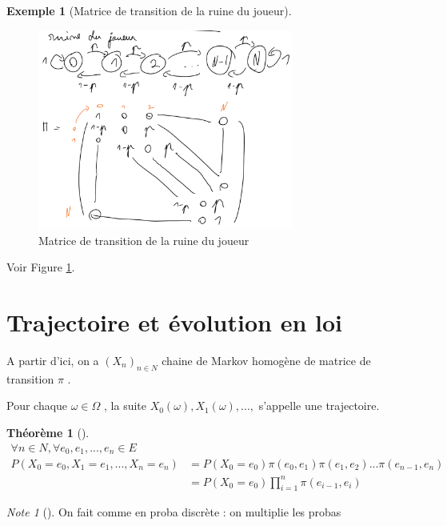 \documentclass{article}
\theoremstyle{plain}%
\newtheorem{thm}{Théorème}[section]
\theoremstyle{definition}
\newtheorem{exmp}{Exemple}[section]
\theoremstyle{remark}
\newtheorem*{note}{Note}
\begin{document}
	\begin{exmp}[Matrice de transition de la ruine du joueur]
		\begin{figure}[!htbp]
			\centering
			\includegraphics[width=0.75\textwidth]{./figures_chap1/figure4.png}
			\caption{Matrice de transition de la ruine du joueur}
			\label{graph2}
		\end{figure}
		Voir Figure \ref{graph2}.
	\end{exmp}
	
	\section{Trajectoire et évolution en loi}
	A partir d'ici, on a $ (X_n)_{n \in N} $ chaine de Markov homogène de matrice de transition $ \pi  $ . 

	Pour chaque $ \omega \in \Omega$ , la suite $X_0(\omega), X_1(\omega ), ... , $ s'appelle une trajectoire.
	
	\begin{thm}[]
		\begin{align*}
			\forall n \in N, \forall e_0, e_1, ..., e_n \in E \\ 
			P(X_0 = e_0, X_1=e_1, ..., X_n=e_n) &= P(X_0= e_0) \pi (e_0,e_1) \pi (e_1, e_2) ... \pi (e_{n-1}, e_n) \\
			&= P(X_0 =e_0) \prod_{i=1}^{n} \pi (e_{i-1}, e_i)
		\end{align*}
	\end{thm}
	\begin{note}[]
		On fait comme en proba discrète : on multiplie les probas
	\end{note}
	
\end{document}
